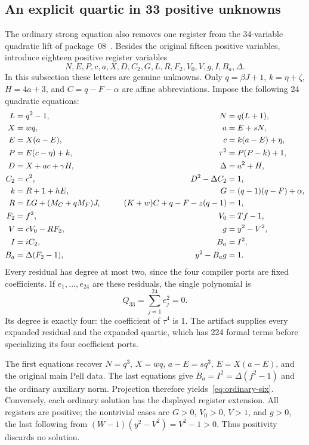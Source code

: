 \subsection{An explicit quartic in 33 positive unknowns}

The ordinary strong equation also removes one register from the
34-variable quadratic lift of package~08~\cite{src08}. Besides the
original fifteen positive variables, introduce eighteen positive
register variables
\[
 N,E,P,c,a,X,D,C_2,G,L,R,F_2,V_0,V,g,I,B_a,\Delta.
\]
In this subsection these letters are genuine unknowns. Only
\(q=\beta J+1\), \(k=\eta+\zeta\), \(H=4a+3\), and
\(C=q-F-\alpha\) are affine abbreviations. Impose the following
24 quadratic equations:
\begin{alignat}{2}\label{eq:quartic33-system}
 L&=q^2-1,&\qquad N&=q(L+1),\notag\\
 X&=wq,&a&=E+sN,\notag\\
 E&=X(a-E),&c&=k(a-E)+\eta,\notag\\
 P&=E(c-\eta)+k,&\tau^2&=P(P-k)+1,\notag\\
 D&=X+ac+\gamma H,&\Delta&=a^2+H,\notag\\
 C_2&=c^2,&D^2-\Delta C_2&=1,\notag\\
 k&=R+1+hE,&G&=(q-1)(q-F)+\alpha,\notag\\
 R&=LG+(M_C+qM_F)J,&\qquad(K+w)C+q-F-z(q-1)&=1,\notag\\
 F_2&=f^2,&V_0&=Tf-1,\notag\\
 V&=cV_0-RF_2,&g&=y^2-V^2,\notag\\
 I&=iC_2,&B_a&=I^2,\notag\\
 B_a&=\Delta(F_2-1),&y^2-B_ag&=1.
\end{alignat}
Every residual has degree at most two, since the four compiler ports are
fixed coefficients. If \(e_1,\ldots,e_{24}\) are these residuals, the
single polynomial is
\begin{equation}\label{eq:quartic33}
 \boxed{Q_{33}=\sum_{j=1}^{24}e_j^2=0.}
\end{equation}
Its degree is exactly four: the coefficient of \(\tau^4\) is 1.
The artifact supplies every expanded residual and the expanded quartic,
which has 224 formal terms before specializing its four coefficient ports.

The first equations recover \(N=q^3\), \(X=wq\), \(a-E=sq^3\),
\(E=X(a-E)\), and the original main Pell data. The last equations give
\(B_a=I^2=\Delta(f^2-1)\) and the ordinary auxiliary norm. Projection
therefore yields~\eqref{eq:ordinary-six}. Conversely, each ordinary
solution has the displayed register extension. All registers are
positive; the nontrivial cases are \(G>0\), \(V_0>0\), \(V>1\), and
\(g>0\), the last following from
\((W-1)(y^2-V^2)=V^2-1>0\). Thus positivity discards no solution.

